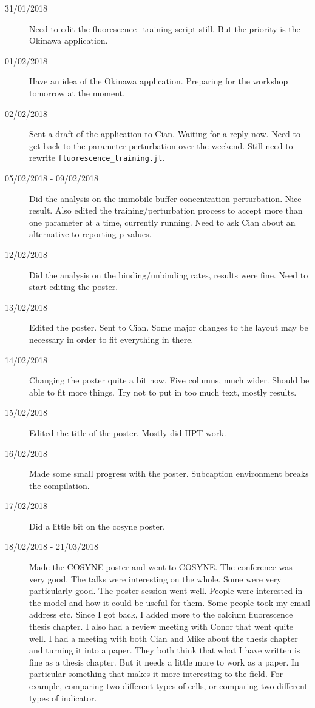 \documentclass[a4paper,12pt]{article}
\theoremstyle{definition}
\begin{document}
\begin{description}
	\item[31/01/2018] Need to edit the fluorescence\_training script still. But the priority is the Okinawa application.

	\item[01/02/2018] Have an idea of the Okinawa application. Preparing for the workshop tomorrow at the moment.

	\item[02/02/2018] Sent a draft of the application to Cian. Waiting for a reply now. Need to get back to the parameter perturbation over the weekend. Still need to rewrite \texttt{fluorescence\_training.jl}.

	\item[05/02/2018 - 09/02/2018] Did the analysis on the immobile buffer concentration perturbation. Nice result. Also edited the training/perturbation process to accept more than one parameter at a time, currently running. Need to ask Cian about an alternative to reporting p-values.

	\item[12/02/2018] Did the analysis on the binding/unbinding rates, results were fine. Need to start editing the poster.

	\item[13/02/2018] Edited the poster. Sent to Cian. Some major changes to the layout may be necessary in order to fit everything in there.

	\item[14/02/2018] Changing the poster quite a bit now. Five columns, much wider. Should be able to fit more things. Try not to put in too much text, mostly results.

	\item[15/02/2018] Edited the title of the poster. Mostly did HPT work.

	\item[16/02/2018] Made some small progress with the poster. Subcaption environment breaks the compilation.

	\item[17/02/2018] Did a little bit on the cosyne poster.

	\item[18/02/2018 - 21/03/2018] Made the COSYNE poster and went to COSYNE. The conference was very good. The talks were interesting on the whole. Some were very particularly good. The poster session went well. People were interested in the model and how it could be useful for them. Some people took my email address etc. Since I got back, I added more to the calcium fluorescence thesis chapter. I also had a review meeting with Conor that went quite well. I had a meeting with both Cian and Mike about the thesis chapter and turning it into a paper. They both think that what I have written is fine as a thesis chapter. But it needs a little more to work as a paper. In particular something that makes it more interesting to the field. For example, comparing two different types of cells, or comparing two different types of indicator.


\end{description}
\end{document}
